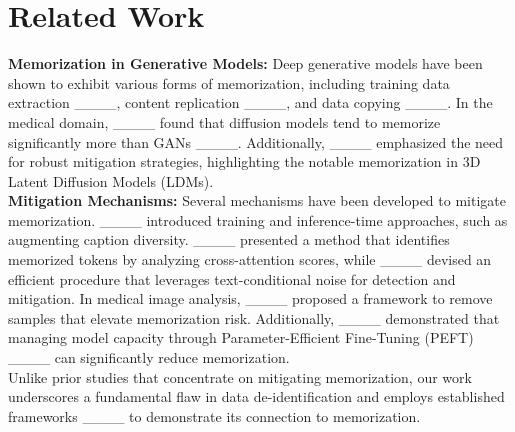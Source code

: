 \section{Related Work}
\textbf{Memorization in Generative Models: }Deep generative models have been shown to exhibit various forms of memorization, including training data extraction ____, content replication ____, and data copying ____. In the medical domain, ____ found that diffusion models tend to memorize significantly more than GANs ____. Additionally, ____ emphasized the need for robust mitigation strategies, highlighting the notable memorization in 3D Latent Diffusion Models (LDMs). \\\textbf{Mitigation Mechanisms: } Several mechanisms have been developed to mitigate memorization. ____ introduced training and inference-time approaches, such as augmenting caption diversity. ____ presented a method that identifies memorized tokens by analyzing cross-attention scores, while ____ devised an efficient procedure that leverages text-conditional noise for detection and mitigation. In medical image analysis, ____ proposed a framework to remove samples that elevate memorization risk. Additionally, ____ demonstrated that managing model capacity through Parameter-Efficient Fine-Tuning (PEFT) ____ can significantly reduce memorization. \\
Unlike prior studies that concentrate on mitigating memorization, our work underscores a fundamental flaw in data de-identification and employs established frameworks ____ to demonstrate its connection to memorization.